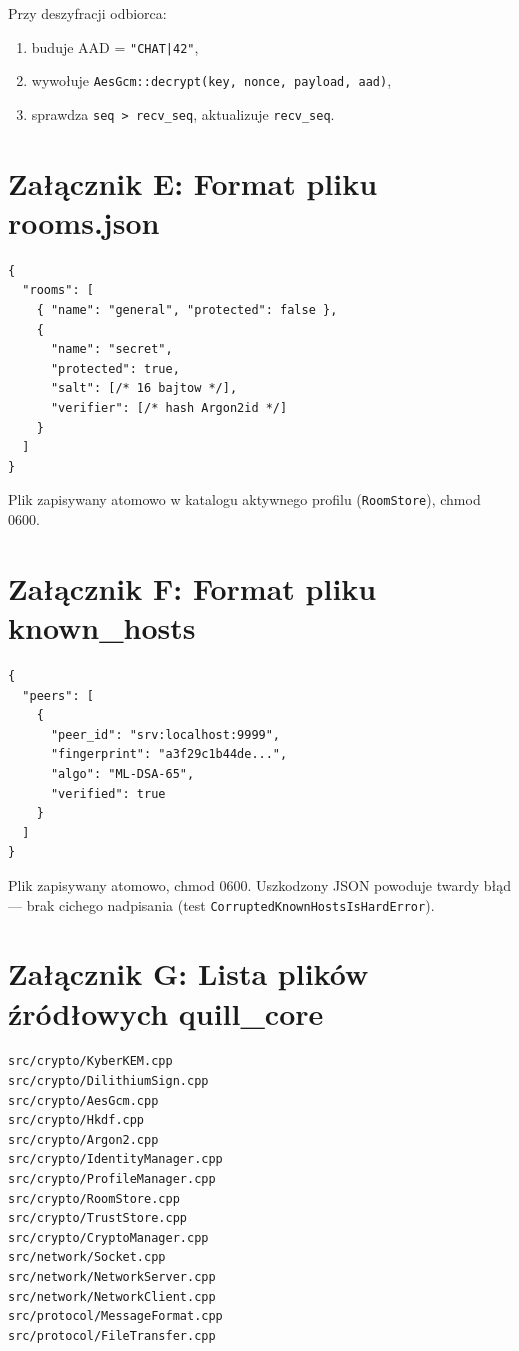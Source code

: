 \documentclass[12pt,a4paper]{article}
\begin{document}
Przy deszyfracji odbiorca:
\begin{enumerate}
    \item buduje AAD = \texttt{"CHAT|42"},
    \item wywołuje \texttt{AesGcm::decrypt(key, nonce, payload, aad)},
    \item sprawdza \texttt{seq > recv\_seq}, aktualizuje \texttt{recv\_seq}.
\end{enumerate}

\section{Załącznik E: Format pliku rooms.json}

\begin{lstlisting}[style=json]
{
  "rooms": [
    { "name": "general", "protected": false },
    {
      "name": "secret",
      "protected": true,
      "salt": [/* 16 bajtow */],
      "verifier": [/* hash Argon2id */]
    }
  ]
}
\end{lstlisting}

Plik zapisywany atomowo w katalogu aktywnego profilu (\texttt{RoomStore}), chmod 0600.

\section{Załącznik F: Format pliku known\_hosts}

\begin{lstlisting}[style=json]
{
  "peers": [
    {
      "peer_id": "srv:localhost:9999",
      "fingerprint": "a3f29c1b44de...",
      "algo": "ML-DSA-65",
      "verified": true
    }
  ]
}
\end{lstlisting}

Plik zapisywany atomowo, chmod 0600. Uszkodzony JSON powoduje twardy błąd --- brak cichego nadpisania (test \texttt{CorruptedKnownHostsIsHardError}).

\section{Załącznik G: Lista plików źródłowych quill\_core}

\begin{lstlisting}[style=bash]
src/crypto/KyberKEM.cpp
src/crypto/DilithiumSign.cpp
src/crypto/AesGcm.cpp
src/crypto/Hkdf.cpp
src/crypto/Argon2.cpp
src/crypto/IdentityManager.cpp
src/crypto/ProfileManager.cpp
src/crypto/RoomStore.cpp
src/crypto/TrustStore.cpp
src/crypto/CryptoManager.cpp
src/network/Socket.cpp
src/network/NetworkServer.cpp
src/network/NetworkClient.cpp
src/protocol/MessageFormat.cpp
src/protocol/FileTransfer.cpp
\end{lstlisting}
\end{document}
